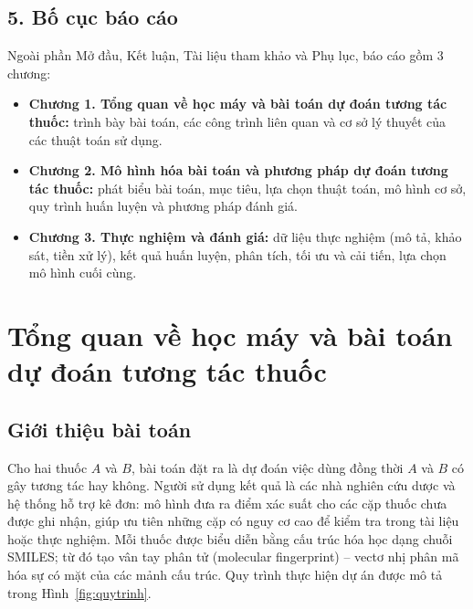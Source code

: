 \documentclass[12pt,a4paper,oneside]{report}
\newcommand{\tenbaitoan}{dự đoán tương tác thuốc} %
\begin{document}
\section*{5. Bố cục báo cáo}
Ngoài phần Mở đầu, Kết luận, Tài liệu tham khảo và Phụ lục, báo cáo gồm
3 chương:
\begin{itemize}
  \item \textbf{Chương 1. Tổng quan về học máy và bài toán \tenbaitoan:} trình bày bài toán,
        các công trình liên quan và cơ sở lý thuyết của các thuật toán sử dụng.
  \item \textbf{Chương 2. Mô hình hóa bài toán và phương pháp \tenbaitoan:} phát biểu bài
        toán, mục tiêu, lựa chọn thuật toán, mô hình cơ sở, quy trình huấn
        luyện và phương pháp đánh giá.
  \item \textbf{Chương 3. Thực nghiệm và đánh giá:} dữ liệu thực nghiệm (mô
        tả, khảo sát, tiền xử lý), kết quả huấn luyện, phân tích, tối ưu và
        cải tiến, lựa chọn mô hình cuối cùng.
\end{itemize}

\chapter{Tổng quan về học máy và bài toán \tenbaitoan}
\label{chap:tongquan}

\section{Giới thiệu bài toán}
Cho hai thuốc $A$ và $B$, bài toán đặt ra là dự đoán việc dùng đồng thời $A$ và
$B$ có gây tương tác hay không. Người sử dụng kết quả là các nhà nghiên cứu dược
và hệ thống hỗ trợ kê đơn: mô hình đưa ra điểm xác suất cho các cặp thuốc chưa
được ghi nhận, giúp ưu tiên những cặp có nguy cơ cao để kiểm tra trong tài liệu
hoặc thực nghiệm. Mỗi thuốc được biểu diễn bằng cấu trúc hóa học dạng chuỗi
SMILES; từ đó tạo vân tay phân tử (molecular fingerprint) -- vectơ nhị phân mã
hóa sự có mặt của các mảnh cấu trúc. Quy trình thực hiện dự án được mô tả trong
Hình~\ref{fig:quytrinh}.
\end{document}
